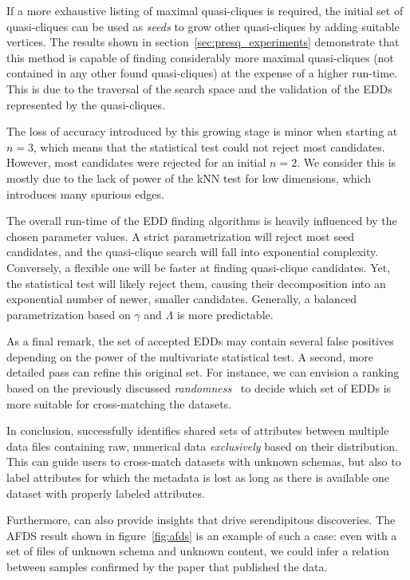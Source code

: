 If a more exhaustive listing of maximal quasi-cliques is required, the initial set of
quasi-cliques can be used as \emph{seeds} to grow other quasi-cliques by adding suitable vertices.
The results shown in  section~\ref{sec:presq_experiments} demonstrate that this method is capable of
finding considerably more maximal quasi-cliques (not contained in any other found quasi-cliques)
at the expense of a higher run-time. This is due to the traversal of the search space and the
validation of the \glspl{EDD} represented by the quasi-cliques.

The loss of accuracy introduced by this growing stage is minor when starting at $n = 3$,
which means that the statistical test could not reject most candidates. However,
most candidates were rejected for an
initial $n = 2$. We consider this is mostly due
to the lack of power of the \gls{kNN} test for low dimensions, which introduces
many spurious edges.

The overall run-time of the \gls{EDD} finding algorithms is heavily influenced by the
chosen parameter values.
A strict parametrization will reject most seed candidates, and the quasi-clique search will fall
into exponential complexity. Conversely, a flexible one will be faster at finding
quasi-clique candidates. Yet, the statistical test will likely reject them, causing their decomposition
into an exponential number of newer, smaller candidates.
Generally, a balanced parametrization based on $\gamma$ and $\Lambda$ is more predictable.

As a final remark, the set of accepted \glspl{EDD} may contain several
false positives depending on the power of the multivariate statistical test.
A second, more detailed pass can refine this original set.
For instance, we can envision a ranking based on the previously discussed \emph{randomness}~\cite{Zhang2010}
to decide which set of \glspl{EDD} is more suitable for cross-matching the datasets.

In conclusion, \PresQ successfully identifies shared sets of attributes
between multiple data files containing raw, numerical data \emph{exclusively} based
on their distribution. This can guide users to cross-match datasets with unknown schemas,
but also to label attributes for which the metadata is lost as long as there is available
one dataset with properly labeled attributes.

Furthermore, \PresQ can also provide insights that drive serendipitous discoveries.
The \gls{AFDS} result shown in figure~\ref{fig:afds} is an example of such a case:
even with a set of files of unknown schema and unknown content, we could infer
a relation between samples confirmed by the paper that published the data.

